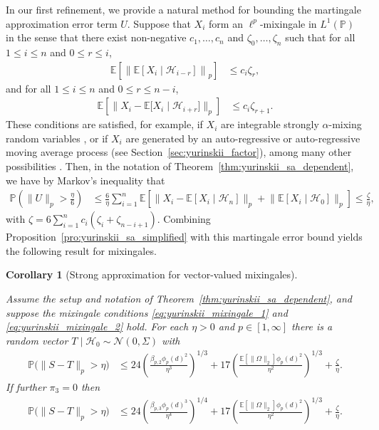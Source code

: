 \documentclass[11pt,lof]{puthesis}
\renewcommand{\P}{\ensuremath{\mathbb{P}}}
\newcommand{\E}{\ensuremath{\mathbb{E}}}
\newcommand{\cH}{\ensuremath{\mathcal{H}}}
\newcommand{\cN}{\ensuremath{\mathcal{N}}}
\theoremstyle{break}
\newtheorem{corollary}{Corollary}[section]
\theoremstyle{proof}
\begin{document}
In our first refinement, we provide a natural method for bounding the
martingale approximation error term $U$. Suppose that $X_i$ form an
$\ell^p$-mixingale in $L^1(\P)$ in the sense that there exist non-negative
$c_1, \ldots, c_n$ and $\zeta_0, \ldots, \zeta_n$ such that for all
$1 \leq i \leq n$ and $0 \leq r \leq i$,
%
\begin{align}
  \label{eq:yurinskii_mixingale_1}
  \E \left[ \left\|
      \E \left[ X_i \mid \cH_{i-r} \right]
  \right\|_p \right]
  &\leq
  c_i \zeta_r,
\end{align}
%
and for all $1 \leq i \leq n$ and $0 \leq r \leq n-i$,
%
\begin{align}
  \label{eq:yurinskii_mixingale_2}
  \E \left[ \big\|
    X_i - \E \big[ X_i \mid \cH_{i+r} \big]
  \big\|_p \right]
  &\leq
  c_i \zeta_{r+1}.
\end{align}
%
These conditions are satisfied, for example, if $X_i$ are integrable strongly
$\alpha$-mixing random variables \citep{mcleish1975invariance}, or if $X_i$ are
generated by an auto-regressive or auto-regressive moving average process (see
Section~\ref{sec:yurinskii_factor}), among many other possibilities
\citep{bradley2005basic}. Then, in the notation of
Theorem~\ref{thm:yurinskii_sa_dependent}, we have by Markov's inequality that
%
\begin{align*}
  \P \left( \|U\|_p > \frac{\eta}{6} \right)
  &\leq
  \frac{6}{\eta}
  \sum_{i=1}^{n}
  \E \left[
    \big\|
    X_i - \E \left[ X_i \mid \cH_n \right]
    \big\|_p
    + \big\|
    \E \left[ X_i \mid \cH_0 \right]
    \big\|_p
  \right]
  \leq \frac{\zeta}{\eta},
\end{align*}
%
with $\zeta = 6 \sum_{i=1}^{n} c_i (\zeta_{i} + \zeta_{n-i+1})$.
Combining Proposition~\ref{pro:yurinskii_sa_simplified} with this
martingale error bound yields the following result for mixingales.
%
\begin{corollary}[Strong approximation for vector-valued mixingales]%
  \label{cor:yurinskii_sa_mixingale}

  Assume the setup and notation of Theorem~\ref{thm:yurinskii_sa_dependent},
  and suppose
  the mixingale conditions \eqref{eq:yurinskii_mixingale_1} and
  \eqref{eq:yurinskii_mixingale_2} hold. For each $\eta > 0$ and
  $p \in [1,\infty]$ there
  is a random vector $T \mid \cH_0 \sim \cN(0, \Sigma)$ with
  \begin{align*}
    \P\big(\|S-T\|_p > \eta\big)
    &\leq
    24 \left(
      \frac{\beta_{p,2} \phi_p(d)^2}{\eta^3}
    \right)^{1/3}
    + 17 \left(
      \frac{\E \left[ \|\Omega\|_2 \right] \phi_p(d)^2}{\eta^2}
    \right)^{1/3}
    + \frac{\zeta}{\eta}.
  \end{align*}
  If further $\pi_3 = 0$ then
  \begin{align*}
    \P\big(\|S-T\|_p > \eta\big)
    &\leq
    24 \left(
      \frac{\beta_{p,3} \phi_p(d)^3}{\eta^4}
    \right)^{1/4}
    + 17 \left(
      \frac{\E \left[ \|\Omega\|_2 \right] \phi_p(d)^2}{\eta^2}
    \right)^{1/3}
    + \frac{\zeta}{\eta}.
  \end{align*}
\end{corollary}
\end{document}
